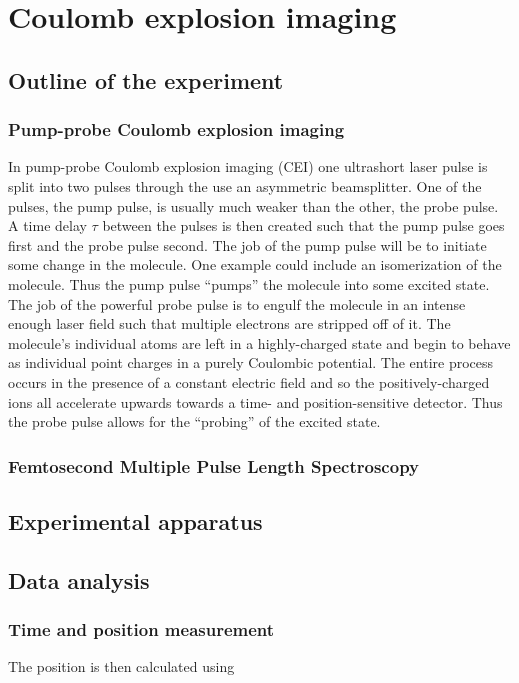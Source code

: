 \chapter{Coulomb explosion imaging}\label{ch:CEI}

\minitoc%

\section{Outline of the experiment}

\subsection{Pump-probe Coulomb explosion imaging}
In pump-probe Coulomb explosion imaging (CEI) one ultrashort laser pulse is split into two pulses through the use an asymmetric beamsplitter. One of the pulses, the pump pulse, is usually much weaker than the other, the probe pulse. A time delay $\tau$ between the pulses is then created such that the pump pulse goes first and the probe pulse second. The job of the pump pulse will be to initiate some change in the molecule. One example could include an isomerization of the molecule. Thus the pump pulse ``pumps'' the molecule into some excited state. The job of the powerful probe pulse is to engulf the molecule in an intense enough laser field such that multiple electrons are stripped off of it. The molecule's individual atoms are left in a highly-charged state and begin to behave as individual point charges in a purely Coulombic potential. The entire process occurs in the presence of a constant electric field and so the positively-charged ions all accelerate upwards towards a time- and position-sensitive detector. Thus the probe pulse allows for the ``probing'' of the excited state.

\subsection{Femtosecond Multiple Pulse Length Spectroscopy}

\section{Experimental apparatus}

\section{Data analysis}
\subsection{Time and position measurement}
The position is then calculated using

